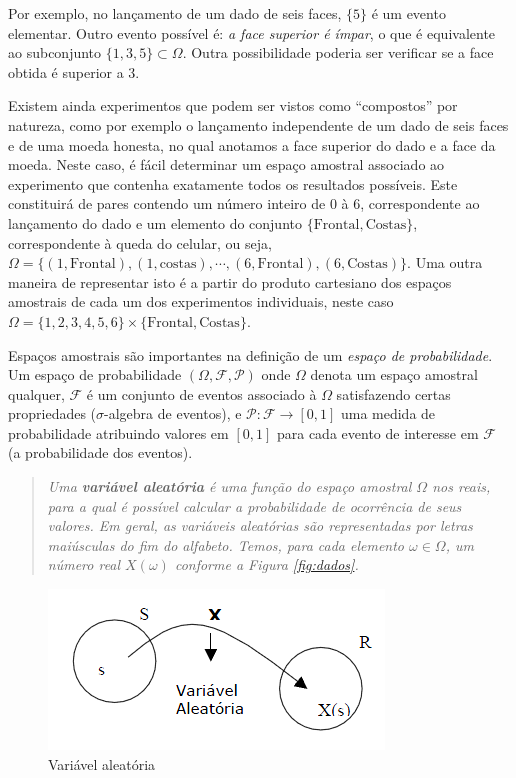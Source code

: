 \documentclass[
]{book}
\theoremstyle{definition}
\theoremstyle{definition}
\theoremstyle{definition}
\theoremstyle{remark}
\begin{document}
Por exemplo, no lançamento de um dado de seis faces, \(\{5\}\) é um evento elementar. Outro evento possível é: \emph{a face superior é ímpar}, o que é equivalente ao subconjunto \(\{1,3,5\}\subset\Omega\). Outra possibilidade poderia ser verificar se a face obtida é superior a 3.

Existem ainda experimentos que podem ser vistos como ``compostos'' por natureza, como por exemplo o lançamento independente de um dado de seis faces e de uma moeda honesta, no qual anotamos a face superior do dado e a face da moeda. Neste caso, é fácil determinar um espaço amostral associado ao experimento que contenha exatamente todos os resultados possíveis. Este constituirá de pares contendo um número inteiro de 0 à 6, correspondente ao lançamento do dado e um elemento do conjunto \(\{\mathrm{Frontal},\mathrm{Costas}\}\), correspondente à queda do celular, ou seja, \(\Omega=\{(1, \mathrm{Frontal}), (1,\mathrm{costas}), \cdots, (6, \mathrm{Frontal}), (6,\mathrm{Costas})\}\). Uma outra maneira de representar isto é a partir do produto cartesiano dos espaços amostrais de cada um dos experimentos individuais, neste caso \(\Omega=\{1,2,3,4,5,6\}\times\{\mathrm{Frontal},\mathrm{Costas}\}\).

Espaços amostrais são importantes na definição de um \emph{espaço de probabilidade}. Um espaço de probabilidade \((\Omega, \mathcal{F},\mathcal{P})\) onde \(\Omega\) denota um espaço amostral qualquer, \(\mathcal{F}\) é um conjunto de eventos associado à \(\Omega\) satisfazendo certas propriedades (\(\sigma\)-algebra de eventos), e \(\mathcal{P}:\mathcal{F}\rightarrow[0,1]\) uma medida de probabilidade atribuindo valores em \([0,1]\) para cada evento de interesse em \(\mathcal{F}\) (a probabilidade dos eventos).

\begin{quote}
\emph{Uma \textbf{variável aleatória} é uma função do espaço amostral
\(\Omega\) nos reais, para a qual é possível calcular a
probabilidade de ocorrência de seus valores. Em geral, as
variáveis aleatórias são representadas por letras maiúsculas do
fim do alfabeto. Temos, para cada elemento \(\omega \in \Omega\), um
número real \(X(\omega)\) conforme a Figura \ref{fig:dados}.}
\end{quote}

\begin{figure}

{\centering \includegraphics[width=0.33\linewidth]{Figuras/VA} 

}

\caption{Variável aleatória}\label{fig:va}
\end{figure}
\end{document}
